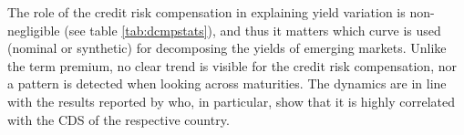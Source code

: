 {The role of the credit risk compensation in explaining yield variation is non-negligible (see table \ref{tab:dcmpstats}), and thus it matters which curve is used (nominal or synthetic) for decomposing the yields of emerging markets. 
Unlike the term premium, no clear trend is visible for the credit risk compensation, nor a pattern is detected when looking across maturities.
The dynamics are in line with the results reported by \cite{DuSchreger:2016JoF} who, in particular, show that it is highly correlated with the CDS of the respective country.

}

